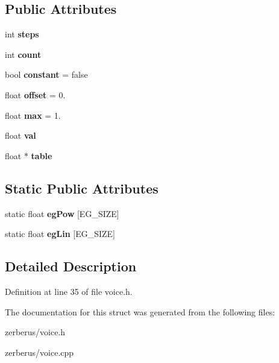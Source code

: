 \subsection*{Public Attributes}
\begin{DoxyCompactItemize}
\item 
\mbox{\label{struct_envelope_ac4dcd2a95b8f4a62ca4bee35fc157f41}} 
int {\bfseries steps}
\item 
\mbox{\label{struct_envelope_aa3ddfe4dbd91f15310ca41f24d1954e0}} 
int {\bfseries count}
\item 
\mbox{\label{struct_envelope_acc935f6cad90de0ff540a8656e9b9ace}} 
bool {\bfseries constant} = false
\item 
\mbox{\label{struct_envelope_a7b16999bff62ec32db8aad4b4d27ec18}} 
float {\bfseries offset} = 0.
\item 
\mbox{\label{struct_envelope_a356f263561c116b512b56febbdf03968}} 
float {\bfseries max} = 1.
\item 
\mbox{\label{struct_envelope_ada81c47dba66b7e7da7427a8f740c8ac}} 
float {\bfseries val}
\item 
\mbox{\label{struct_envelope_a3195d08de88a0ecf3e208edbb955db44}} 
float $\ast$ {\bfseries table}
\end{DoxyCompactItemize}
\subsection*{Static Public Attributes}
\begin{DoxyCompactItemize}
\item 
\mbox{\label{struct_envelope_a69aead7a2855dc84877b47c6dbce94d2}} 
static float {\bfseries eg\+Pow} \mbox{[}E\+G\+\_\+\+S\+I\+ZE\mbox{]}
\item 
\mbox{\label{struct_envelope_adaed4b7eec87e4fcc2b4ac2c0ff10a30}} 
static float {\bfseries eg\+Lin} \mbox{[}E\+G\+\_\+\+S\+I\+ZE\mbox{]}
\end{DoxyCompactItemize}


\subsection{Detailed Description}


Definition at line 35 of file voice.\+h.



The documentation for this struct was generated from the following files\+:\begin{DoxyCompactItemize}
\item 
zerberus/voice.\+h\item 
zerberus/voice.\+cpp\end{DoxyCompactItemize}

